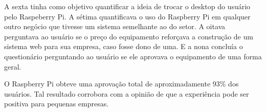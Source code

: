 A sexta tinha como objetivo quantificar a ideia de trocar o desktop do usuário pelo Raspeberry Pi. A sétima quantificava o uso do Raspberry Pi em qualquer outro negócio que tivesse um sistema semelhante ao do setor. A oitava perguntava ao usuário se o preço do equipamento reforçava a construção de um sistema web para sua empresa, caso fosse dono de uma. E a nona concluía o questionário perguntando ao usuário se ele aprovava o equipamento de uma forma geral.

O Raspberry Pi obteve uma aprovação total de aproximadamente 93\% dos usuários. Tal resultado corrobora com a opinião de que a experiência pode ser positiva para pequenas empresas.